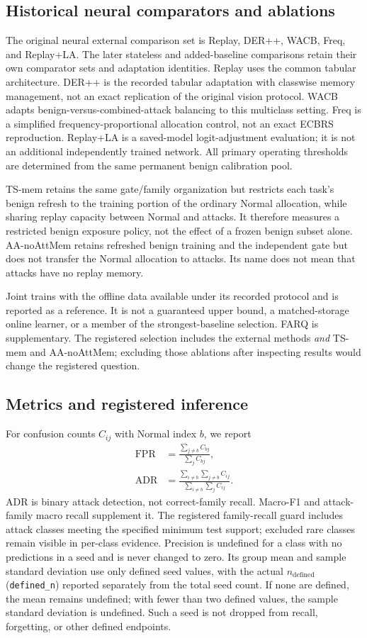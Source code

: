 \documentclass[10pt,twocolumn]{article}
\begin{document}
\subsection{Historical neural comparators and ablations}
The original neural external comparison set is Replay, DER++, WACB, Freq, and Replay+LA. The later stateless and added-baseline comparisons retain their own comparator sets and adaptation identities. Replay uses the common tabular architecture. DER++ is the recorded tabular adaptation with classwise memory management, not an exact replication of the original vision protocol. WACB adapts benign-versus-combined-attack balancing to this multiclass setting. Freq is a simplified frequency-proportional allocation control, not an exact ECBRS reproduction. Replay+LA is a saved-model logit-adjustment evaluation; it is not an additional independently trained network. All primary operating thresholds are determined from the same permanent benign calibration pool.

TS-mem retains the same gate/family organization but restricts each task's benign refresh to the training portion of the ordinary Normal allocation, while sharing replay capacity between Normal and attacks. It therefore measures a restricted benign exposure policy, not the effect of a frozen benign subset alone. AA-noAttMem retains refreshed benign training and the independent gate but does not transfer the Normal allocation to attacks. Its name does not mean that attacks have no replay memory.

Joint trains with the offline data available under its recorded protocol and is reported as a reference. It is not a guaranteed upper bound, a matched-storage online learner, or a member of the strongest-baseline selection. FARQ is supplementary. The registered selection includes the external methods \emph{and} TS-mem and AA-noAttMem; excluding those ablations after inspecting results would change the registered question.

\subsection{Metrics and registered inference}
For confusion counts $C_{ij}$ with Normal index $b$, we report
\begin{align}
 \mathrm{FPR}&=\frac{\sum_{j\ne b}C_{bj}}{\sum_j C_{bj}},\\
 \mathrm{ADR}&=\frac{\sum_{i\ne b}\sum_{j\ne b}C_{ij}}{\sum_{i\ne b}\sum_j C_{ij}}.
\end{align}
ADR is binary attack detection, not correct-family recall. Macro-F1 and attack-family macro recall supplement it. The registered family-recall guard includes attack classes meeting the specified minimum test support; excluded rare classes remain visible in per-class evidence. Precision is undefined for a class with no predictions in a seed and is never changed to zero. Its group mean and sample standard deviation use only defined seed values, with the actual $n_{\mathrm{defined}}$ (\texttt{defined\_n}) reported separately from the total seed count. If none are defined, the mean remains undefined; with fewer than two defined values, the sample standard deviation is undefined. Such a seed is not dropped from recall, forgetting, or other defined endpoints.
\end{document}
